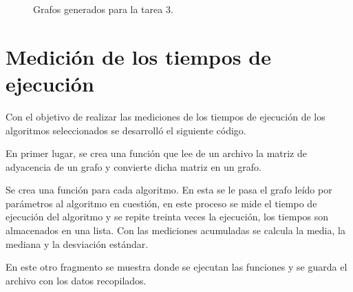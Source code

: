 \documentclass{article}
\begin{document}
\begin{figure}[h]

\caption{Grafos generados para la tarea 3.} 
\end{figure}
\newpage
\section{Medición de los tiempos de ejecución}
Con el objetivo de realizar las mediciones de los tiempos de ejecución de los algoritmos seleccionados se desarrolló el siguiente código.

En primer lugar, se crea una función que lee de un archivo la matriz de adyacencia de un grafo y convierte dicha matriz en un grafo.
\begin{center}

\end{center}
Se crea una función para cada algoritmo. En esta se le pasa el grafo leído por parámetros al algoritmo en cuestión, en este proceso se mide el tiempo de ejecución del algoritmo y se repite treinta veces la ejecución, los tiempos son almacenados en una lista. Con las mediciones acumuladas se calcula la media, la mediana y la desviación estándar.
 \begin{center}

\end{center}
En este otro fragmento se muestra donde se ejecutan las funciones y se guarda el archivo con los datos recopilados.
 \begin{center}

\end{center}
\end{document}
